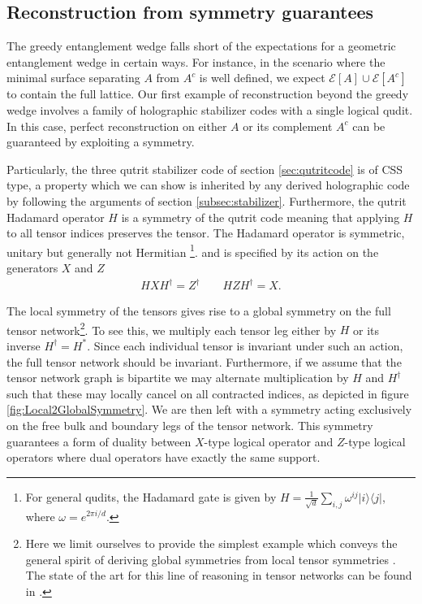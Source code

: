 \documentclass[12pt]{article}
\theoremstyle{plain}
\theoremstyle{plain}
\theoremstyle{plain}
\theoremstyle{plain}
\theoremstyle{result}
\theoremstyle{remark}
\theoremstyle{conjecture}
\theoremstyle{observation}
\theoremstyle{definition}
\theoremstyle{corollary}
\theoremstyle{definition}
\theoremstyle{definition}
\theoremstyle{assumption}
\theoremstyle{definition}
\theoremstyle{problem}
\theoremstyle{fact}
\newcommand*{\cE}{\mathcal{E}}
\begin{document}
\subsection{Reconstruction from symmetry guarantees}

The greedy entanglement wedge falls short of the expectations for a geometric entanglement wedge in certain ways.
For instance, in the scenario where the minimal surface separating $A$ from $A^c$ is well defined, we expect $\cE[A] \cup \cE[A^c]$ to contain the full lattice.
Our first example of reconstruction beyond the greedy wedge involves a family of holographic stabilizer codes with a single logical qudit.
In this case, perfect reconstruction on either $A$ or its complement $A^c$ can be guaranteed by exploiting a symmetry.

Particularly, the three qutrit stabilizer code of section \ref{sec:qutritcode} is of CSS \cite{Nielsen_Chuang} type, a property  which we can show is inherited by any derived holographic code by following the arguments of section \ref{subsec:stabilizer}.
Furthermore, the qutrit Hadamard operator $H$ is a symmetry of the qutrit code meaning that applying $H$ to all tensor indices preserves the tensor.
The Hadamard operator is symmetric, unitary but generally not Hermitian
 \footnote{
For general qudits, the Hadamard gate is given by $H=\frac{1}{\sqrt{d}}\sum_{i,j} \omega^{ij}| i\rangle\langle j |$, where $\omega=e^{2\pi i/d}$.}.
 and is specified by its action on the generators $X$ and $Z$
\begin{align}
H X H^\dagger = Z^\dagger \qquad H Z H^\dagger = X.
\end{align}

The local symmetry of the tensors gives rise to a global symmetry on the full tensor network\footnote{
Here we limit ourselves to provide the simplest example which conveys the general spirit of deriving global symmetries from local tensor symmetries \cite{Schuch2010}.
The state of the art for this line of reasoning in tensor networks can be found in \cite{Sahinoglu2014, Buerschaper2014}.}.
To see this, we multiply each tensor leg either by $H$ or its inverse $H^\dagger=H^*$.
Since each individual tensor is invariant under such an action, the full tensor network should be invariant.
Furthermore, if we assume that the tensor network graph  is bipartite we may  alternate multiplication by $H$ and $H^\dagger$ such that these may locally cancel on all contracted indices, as depicted in figure \ref{fig:Local2GlobalSymmetry}.
We are then left with a symmetry acting exclusively on the free bulk and boundary legs of the tensor network.
This symmetry guarantees a form of duality between $X$-type logical operator and $Z$-type logical operators where dual operators have exactly the same support. 
\end{document}
